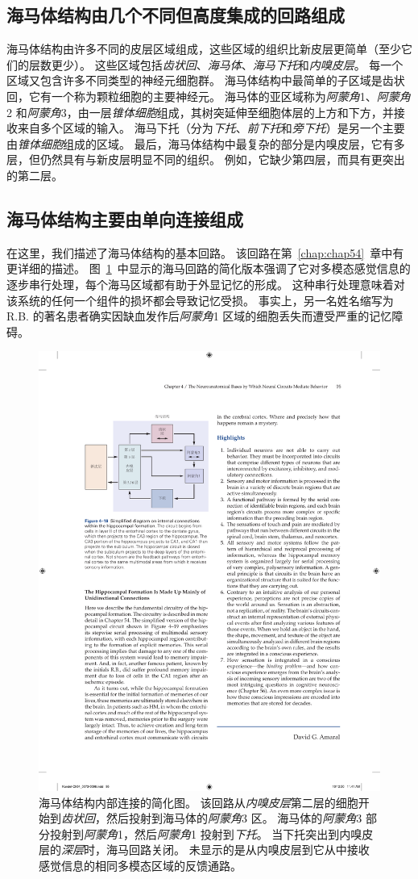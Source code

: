 \subsection{海马体结构由几个不同但高度集成的回路组成}

海马体结构由许多不同的皮层区域组成，这些区域的组织比新皮层更简单（至少它们的层数更少）。
这些区域包括\textit{齿状回}、\textit{海马体}、\textit{海马下托}和\textit{内嗅皮层}。 
每一个区域又包含许多不同类型的神经元细胞群。
海马体结构中最简单的子区域是齿状回，它有一个称为颗粒细胞的主要神经元。
海马体的亚区域称为\textit{阿蒙角}1、\textit{阿蒙角}2 和\textit{阿蒙角}3，由一层\textit{锥体细胞}组成，其树突延伸至细胞体层的上方和下方，并接收来自多个区域的输入。
海马下托（分为\textit{下托}、\textit{前下托}和\textit{旁下托}）是另一个主要由\textit{锥体细胞}组成的区域。
最后，海马体结构中最复杂的部分是内嗅皮层，它有多层，但仍然具有与新皮层明显不同的组织。
例如，它缺少第四层，而具有更突出的第二层。



\subsection{海马体结构主要由单向连接组成}

在这里，我们描述了海马体结构的基本回路。
该回路在第~\ref{chap:chap54}~章中有更详细的描述。
图~\ref{fig:4_19}~中显示的海马回路的简化版本强调了它对多模态感觉信息的逐步串行处理，每个海马区域都有助于外显记忆的形成。
这种串行处理意味着对该系统的任何一个组件的损坏都会导致记忆受损。
事实上，另一名姓名缩写为 R.B. 的著名患者确实因缺血发作后\textit{阿蒙角}1 区域的细胞丢失而遭受严重的记忆障碍。


\begin{figure}[htbp]
	\centering
	\includegraphics[width=0.6\linewidth]{chap04/fig_4_19}
	\caption{海马体结构内部连接的简化图。 
		该回路从\textit{内嗅皮层}第二层的细胞开始到\textit{齿状回}，然后投射到海马体的\textit{阿蒙角}3 区。
		海马体的\textit{阿蒙角}3 部分投射到\textit{阿蒙角}1，然后\textit{阿蒙角}1 投射到\textit{下托}。
		当下托突出到内嗅皮层的\textit{深层}时，海马回路关闭。
		未显示的是从内嗅皮层到它从中接收感觉信息的相同多模态区域的反馈通路。}
	\label{fig:4_19}
\end{figure}



